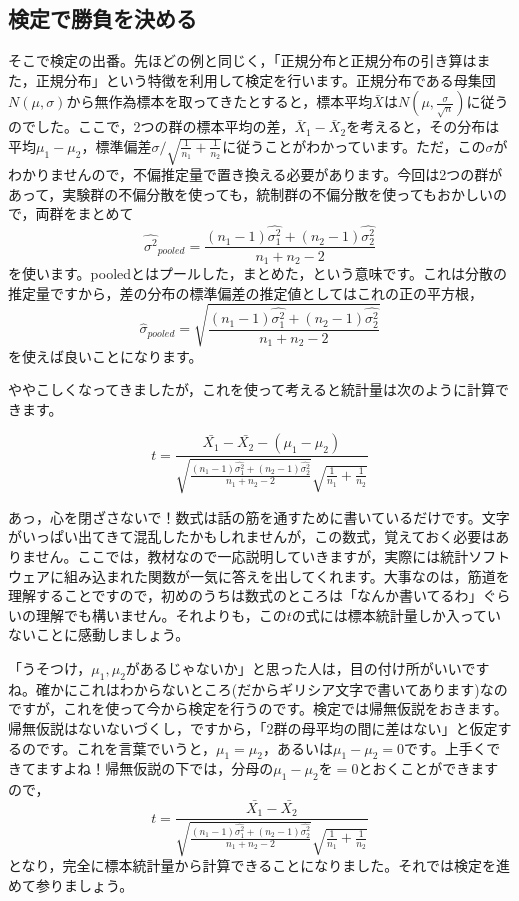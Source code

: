 \documentclass{ltjsbook}
\begin{document}
\subsection{検定で勝負を決める}
そこで検定の出番。先ほどの例と同じく，「正規分布と正規分布の引き算はまた，正規分布」という特徴を利用して検定を行います。正規分布である母集団$N(\mu,\sigma)$から無作為標本を取ってきたとすると，標本平均$\bar{X}$は$N(\mu,\frac{\sigma}{\sqrt{n}})$に従うのでした。ここで，2つの群の標本平均の差，$\bar{X}_1 - \bar{X}_2$を考えると，その分布は平均$\mu_1-\mu_2$，標準偏差$\sigma/\sqrt{\frac{1}{n_1}+\frac{1}{n_2}}$に従うことがわかっています。ただ，この$\sigma$がわかりませんので，不偏推定量で置き換える必要があります。今回は2つの群があって，実験群の不偏分散を使っても，統制群の不偏分散を使ってもおかしいので，両群をまとめて
\[ \hat{\sigma^2}_{pooled} = \frac{(n_1-1)\hat{\sigma_1^2}+(n_2-1)\hat{\sigma_2^2}}{n_1+n_2 - 2}\]
を使います。pooledとはプールした，まとめた，という意味です。これは分散の推定量ですから，差の分布の標準偏差の推定値としてはこれの正の平方根，
\[ \hat{\sigma}_{pooled} = \sqrt{\frac{(n_1-1)\hat{\sigma_1^2}+(n_2-1)\hat{\sigma_2^2}}{n_1+n_2 - 2}}\]を使えば良いことになります。

ややこしくなってきましたが，これを使って考えると統計量は次のように計算できます。

\[ t = \frac{\bar{X_1}-\bar{X_2}-(\mu_1-\mu_2)}{\sqrt{\frac{(n_1-1)\hat{\sigma_1^2}+(n_2-1)\hat{\sigma_2^2}}{n_1+n_2 - 2}}\sqrt{\frac{1}{n_1}+\frac{1}{n_2}}}\]

あっ，心を閉ざさないで！数式は話の筋を通すために書いているだけです。文字がいっぱい出てきて混乱したかもしれませんが，この数式，覚えておく必要はありません。ここでは，教材なので一応説明していきますが，実際には統計ソフトウェアに組み込まれた関数が一気に答えを出してくれます。大事なのは，筋道を理解することですので，初めのうちは数式のところは「なんか書いてるわ」ぐらいの理解でも構いません。それよりも，この$t$の式には標本統計量しか入っていないことに感動しましょう。

「うそつけ，$\mu_1,\mu_2$があるじゃないか」と思った人は，目の付け所がいいですね。確かにこれはわからないところ(だからギリシア文字で書いてあります)なのですが，これを使って今から検定を行うのです。検定では帰無仮説をおきます。帰無仮説はないないづくし，ですから，「2群の母平均の間に差はない」と仮定するのです。これを言葉でいうと，$\mu_1=\mu_2$，あるいは$\mu_1-\mu_2=0$です。上手くできてますよね！帰無仮説の下では，分母の$\mu_1-\mu_2$を$=0$とおくことができますので，
\[ t = \frac{\bar{X_1}-\bar{X_2}}{\sqrt{\frac{(n_1-1)\hat{\sigma_1^2}+(n_2-1)\hat{\sigma_2^2}}{n_1+n_2 - 2}}\sqrt{\frac{1}{n_1}+\frac{1}{n_2}}}\]
となり，完全に標本統計量から計算できることになりました。それでは検定を進めて参りましょう。
\end{document}
